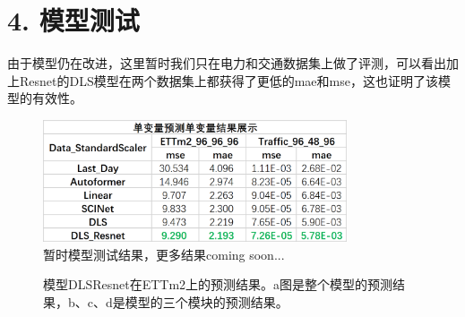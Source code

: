 \documentclass[twoside,a4paper]{article}
\begin{document}
\section*{4. 模型测试}
由于模型仍在改进，这里暂时我们只在电力和交通数据集上做了评测，可以看出加上Resnet的DLS模型在两个数据集上都获得了更低的mae和mse，这也证明了该模型的有效性。

\begin{figure}[H]
\centering 
\includegraphics[width=0.8\textwidth]{1.png} 
\caption{暂时模型测试结果，更多结果coming soon...}
\end{figure}

\begin{figure}[H]
\centering  %
\caption{模型DLSResnet在ETTm2上的预测结果。a图是整个模型的预测结果，b、c、d是模型的三个模块的预测结果。}
\end{figure}
\end{document}
